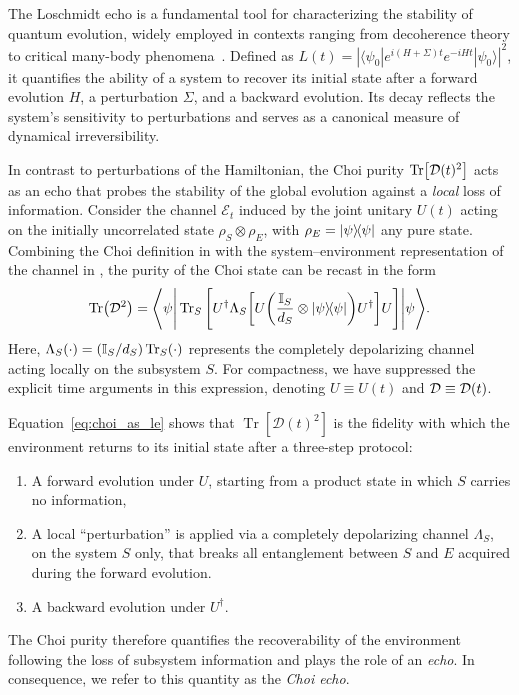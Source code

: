\documentclass[pra,twocolumn,aps,showpacs,superscriptaddress,longbibliography]{revtex4-2}
\begin{document}
The Loschmidt echo is a fundamental tool for characterizing the stability of quantum evolution, widely employed in contexts ranging from decoherence theory to critical many-body phenomena~\cite{peres_1984_stability,gorin_2006_dynamics}. Defined as $L(t) = |\langle \psi_0 | e^{i (H+\Sigma) t} e^{-i H t} | \psi_0 \rangle|^2$, it quantifies the ability of a system to recover its initial state after a forward evolution $H$, a perturbation $\Sigma$, and a backward evolution. Its decay reflects the system’s sensitivity to perturbations and serves as a canonical measure of dynamical irreversibility.

In contrast to perturbations of the Hamiltonian, the Choi purity  $\Tr[\mathcal{D}(t)^2]$ acts as an echo that probes the stability of the global evolution against a \textit{local} loss of information. Consider the channel $\mathcal{E}_t$ induced by the joint unitary $U(t)$ acting on the initially uncorrelated state $\rho_S\otimes\rho_E$, with $\rho_E=\dyad{\psi}$ any pure state. Combining the Choi definition in  with the system–environment representation of the channel in , the purity of the Choi state can be recast in the form
\begin{equation}\label{eq:choi_as_le}
\Tr(\mcD^2) = \Bigg\langle\psi\Bigg|
\Tr_S\Bigg[
U^\dagger \Lambda_S \bqty{
U \pqty{\frac{\mathbb{I}_S}{d_S} \otimes \dyad{\psi} } U^\dagger
} U
\Bigg]
\Bigg|\psi\Bigg\rangle.
\end{equation}
Here, $\Lambda_S(\cdot) = (\mathbb{I}_S/d_S)\Tr_S(\cdot)$ represents the completely depolarizing channel acting locally on the subsystem $S$. 
For compactness, we have suppressed the explicit time arguments in this expression, denoting $U \equiv U(t)$ and $\mathcal{D} \equiv \mathcal{D}(t)$.

Equation~\eqref{eq:choi_as_le} shows that $\operatorname{Tr}[\mathcal{D}(t)^2]$ is the fidelity with which the environment returns to its initial state after a three-step protocol:  
\begin{enumerate}
\item A forward evolution under $U$, starting from a product state in which $S$ carries no information,
\item A local ``perturbation'' is applied via a completely depolarizing channel $\Lambda_S$, on the system $S$ only, that breaks all entanglement between $S$ and $E$ acquired during the forward evolution.
\item A backward evolution under $U^\dagger$.  
\end{enumerate}
The Choi purity therefore quantifies the recoverability of the environment following the loss of subsystem information and plays the role of an \textit{echo}. In consequence, we refer to this quantity as the \textit{Choi echo}.
\end{document}

